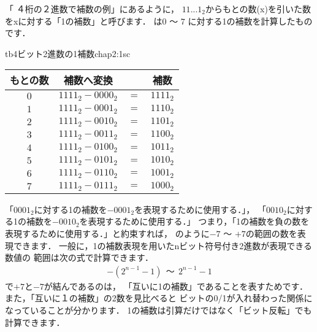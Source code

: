 「 ４桁の２進数で補数の例」にあるように，
$11...1_2$からもとの数(x)を引いた数をxに対する「1の補数」と呼びます．
は$0$ 〜 $7$ に対する1の補数を計算したものです．

\begin{mytable}{tb}{4ビット2進数の1補数}{chap2:1sc}
{\small\begin{tabular}{ c | r c r}
\hline
\hline
もとの数 & \multicolumn{1}{|c}{補数へ変換} & & \multicolumn{1}{c}{補数} \\
\hline
$0$  & $1111_2 - 0000_2$ & $=$ & $1111_2$ \\
$1$  & $1111_2 - 0001_2$ & $=$ & $1110_2$ \\
$2$  & $1111_2 - 0010_2$ & $=$ & $1101_2$ \\
$3$  & $1111_2 - 0011_2$ & $=$ & $1100_2$ \\
$4$  & $1111_2 - 0100_2$ & $=$ & $1011_2$ \\
$5$  & $1111_2 - 0101_2$ & $=$ & $1010_2$ \\
$6$  & $1111_2 - 0110_2$ & $=$ & $1001_2$ \\
$7$  & $1111_2 - 0111_2$ & $=$ & $1000_2$ \\
\end{tabular}}
\end{mytable}

「$0001_2$に対する1の補数を$-0001_2$を表現するために使用する．」，
「$0010_2$に対する1の補数を$-0010_2$を表現するために使用する．」
つまり，「1の補数を負の数を表現するために使用する．」と約束すれば，
のように$-7$ 〜 $+7$の範囲の数を表現できます．
一般に，1の補数表現を用いたnビット符号付き2進数が表現できる数値の
範囲は次の式で計算できます．
{\small\begin{align*}
-(2^{n-1}-1) ~~ 〜 ~~ 2^{n-1}-1
\end{align*}}
で$+7$と$-7$が結んであるのは，
「互いに1の補数」であることを表すためです．
また，「互いに１の補数」の2数を見比べると
ビットの0/1が入れ替わった関係になっていることが分かります．
1の補数は引算だけではなく「ビット反転」でも計算できます．


